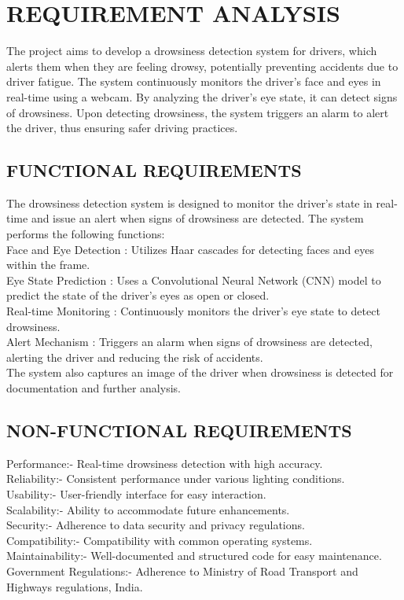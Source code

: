 \documentclass[12pt]{article}
\begin{document}
\newpage
\section{REQUIREMENT ANALYSIS  }
The project aims to develop a drowsiness detection system for drivers, which alerts them when they are feeling drowsy, potentially preventing accidents due to driver fatigue. The system continuously monitors the driver's face and eyes in real-time using a webcam. By analyzing the driver's eye state, it can detect signs of drowsiness. Upon detecting drowsiness, the system triggers an alarm to alert the driver, thus ensuring safer driving practices.

\subsection{FUNCTIONAL REQUIREMENTS}

The drowsiness detection system is designed to monitor the driver's state in real-time and issue an alert when signs of drowsiness are detected. The system performs the following functions:\\

Face and Eye Detection : Utilizes Haar cascades for detecting faces and eyes within the frame.\\
Eye State Prediction : Uses a Convolutional Neural Network (CNN) model to predict the state of the driver's eyes as open or closed.\\
Real-time Monitoring : Continuously monitors the driver's eye state to detect drowsiness.\\
Alert Mechanism : Triggers an alarm when signs of drowsiness are detected, alerting the driver and reducing the risk of accidents.\\

The system also captures an image of the driver when drowsiness is detected for documentation and further analysis.

\subsection{NON-FUNCTIONAL REQUIREMENTS}

Performance:- Real-time drowsiness detection with high accuracy.\\
Reliability:- Consistent performance under various lighting conditions.\\
Usability:- User-friendly interface for easy interaction.\\
Scalability:- Ability to accommodate future enhancements.\\
Security:- Adherence to data security and privacy regulations.\\
Compatibility:- Compatibility with common operating systems.\\
Maintainability:- Well-documented and structured code for easy maintenance.\\
Government Regulations:- Adherence to Ministry of Road Transport and Highways regulations, India.\\
\end{document}
